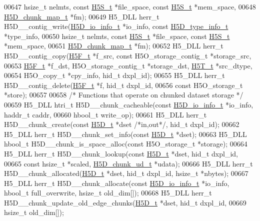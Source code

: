 \begin{DoxyCode}
00647     hsize\_t nelmts, \textcolor{keyword}{const} \hyperlink{struct_h5_s__t}{H5S\_t} *file\_space, \textcolor{keyword}{const} \hyperlink{struct_h5_s__t}{H5S\_t} *mem\_space,
00648     \hyperlink{struct_h5_d__chunk__map__t}{H5D\_chunk\_map\_t} *fm);
00649 H5\_DLL herr\_t H5D\_\_contig\_write(\hyperlink{struct_h5_d__io__info__t}{H5D\_io\_info\_t} *io\_info, \textcolor{keyword}{const} 
      \hyperlink{struct_h5_d__type__info__t}{H5D\_type\_info\_t} *type\_info,
00650     hsize\_t nelmts, \textcolor{keyword}{const} \hyperlink{struct_h5_s__t}{H5S\_t} *file\_space, \textcolor{keyword}{const} \hyperlink{struct_h5_s__t}{H5S\_t} *mem\_space,
00651     \hyperlink{struct_h5_d__chunk__map__t}{H5D\_chunk\_map\_t} *fm);
00652 H5\_DLL herr\_t H5D\_\_contig\_copy(\hyperlink{struct_h5_f__t}{H5F\_t} *f\_src, \textcolor{keyword}{const} H5O\_storage\_contig\_t *storage\_src,
00653     \hyperlink{struct_h5_f__t}{H5F\_t} *f\_dst, H5O\_storage\_contig\_t *storage\_dst, \hyperlink{struct_h5_t__t}{H5T\_t} *src\_dtype,
00654     H5O\_copy\_t *cpy\_info, hid\_t dxpl\_id);
00655 H5\_DLL herr\_t H5D\_\_contig\_delete(\hyperlink{struct_h5_f__t}{H5F\_t} *f, hid\_t dxpl\_id,
00656     \textcolor{keyword}{const} H5O\_storage\_t *store);
00657 
00658 \textcolor{comment}{/* Functions that operate on chunked dataset storage */}
00659 H5\_DLL htri\_t H5D\_\_chunk\_cacheable(\textcolor{keyword}{const} \hyperlink{struct_h5_d__io__info__t}{H5D\_io\_info\_t} *io\_info, haddr\_t caddr,
00660     hbool\_t write\_op);
00661 H5\_DLL herr\_t H5D\_\_chunk\_create(\textcolor{keyword}{const} \hyperlink{struct_h5_d__t}{H5D\_t} *dset \textcolor{comment}{/*in,out*/}, hid\_t dxpl\_id);
00662 H5\_DLL herr\_t H5D\_\_chunk\_set\_info(\textcolor{keyword}{const} \hyperlink{struct_h5_d__t}{H5D\_t} *dset);
00663 H5\_DLL hbool\_t H5D\_\_chunk\_is\_space\_alloc(\textcolor{keyword}{const} H5O\_storage\_t *storage);
00664 H5\_DLL herr\_t H5D\_\_chunk\_lookup(\textcolor{keyword}{const} \hyperlink{struct_h5_d__t}{H5D\_t} *dset, hid\_t dxpl\_id,
00665     \textcolor{keyword}{const} hsize\_t *scaled, \hyperlink{struct_h5_d__chunk__ud__t}{H5D\_chunk\_ud\_t} *udata);
00666 H5\_DLL herr\_t H5D\_\_chunk\_allocated(\hyperlink{struct_h5_d__t}{H5D\_t} *dset, hid\_t dxpl\_id, hsize\_t *nbytes);
00667 H5\_DLL herr\_t H5D\_\_chunk\_allocate(\textcolor{keyword}{const} \hyperlink{struct_h5_d__io__info__t}{H5D\_io\_info\_t} *io\_info, hbool\_t full\_overwrite, 
      hsize\_t old\_dim[]);
00668 H5\_DLL herr\_t H5D\_\_chunk\_update\_old\_edge\_chunks(\hyperlink{struct_h5_d__t}{H5D\_t} *dset, hid\_t dxpl\_id,
00669     hsize\_t old\_dim[]);

\end{DoxyCode}
